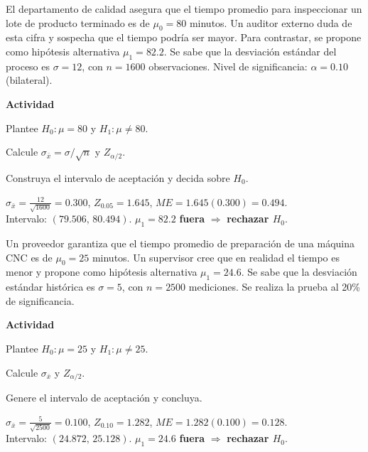 \begin{ejercicio}[Tiempo de inspección de calidad (n=1600)]
El departamento de calidad asegura que el tiempo promedio para inspeccionar un
lote de producto terminado es de $\mu_0=80$ minutos. Un auditor externo duda de
esta cifra y sospecha que el tiempo podría ser mayor. Para contrastar, se propone
como hipótesis alternativa $\mu_1=82.2$. Se sabe que la desviación estándar del
proceso es $\sigma=12$, con $n=1600$ observaciones. Nivel de significancia:
$\alpha=0.10$ (bilateral).


\textbf{Actividad}
\begin{pasos}
  \item Plantee $H_0:\mu=80$ y $H_1:\mu\neq80$.
  \item Calcule $\sigma_{\bar{x}}=\sigma/\sqrt{n}$ y $Z_{\alpha/2}$.
  \item Construya el intervalo de aceptación y decida sobre $H_0$.
\end{pasos}

\begin{clave}
$\sigma_{\bar{x}}=\frac{12}{\sqrt{1600}}=0.300$, \;
$Z_{0.05}=1.645$, \;
$ME=1.645(0.300)=0.494$.\\
Intervalo: $(79.506,\,80.494)$. \;
$\mu_1=82.2$ \textbf{fuera} $\Rightarrow$ \textbf{rechazar $H_0$}.
\end{clave}
\end{ejercicio}


\begin{ejercicio}[Tiempos de preparación de máquina CNC (n=2500)]
Un proveedor garantiza que el tiempo promedio de preparación de una máquina CNC
es de $\mu_0=25$ minutos. Un supervisor cree que en realidad el tiempo es menor
y propone como hipótesis alternativa $\mu_1=24.6$. Se sabe que la desviación
estándar histórica es $\sigma=5$, con $n=2500$ mediciones. Se realiza la prueba
al 20\% de significancia.


\textbf{Actividad}
\begin{pasos}
  \item Plantee $H_0:\mu=25$ y $H_1:\mu\neq25$.
  \item Calcule $\sigma_{\bar{x}}$ y $Z_{\alpha/2}$.
  \item Genere el intervalo de aceptación y concluya.
\end{pasos}

\begin{clave}
$\sigma_{\bar{x}}=\frac{5}{\sqrt{2500}}=0.100$, \;
$Z_{0.10}=1.282$, \;
$ME=1.282(0.100)=0.128$.\\
Intervalo: $(24.872,\,25.128)$. \;
$\mu_1=24.6$ \textbf{fuera} $\Rightarrow$ \textbf{rechazar $H_0$}.
\end{clave}
\end{ejercicio}


